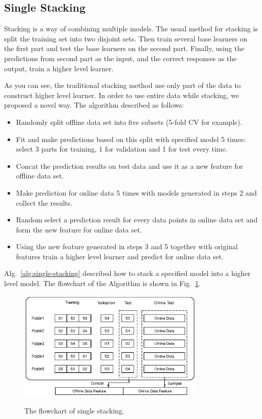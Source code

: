 \documentclass[12pt]{article}
\begin{document}
\subsection{Single Stacking}
\label{chap:single-stacking}

Stacking is a way of combining multiple models. The usual method for stacking is split the training set into two disjoint sets. Then train several base learners on the first part and test the base learners on the second part. Finally, using the predictions from second part as the input, and the correct responses as the output, train a higher level learner.

As you can see, the traditional stacking method use only part of the data to construct higher level learner. In order to use entire data while stacking, we proposed a novel way. The algorithm described as follows:

\begin{itemize}
\label{alg:single-stacking}
\item[1.] Randomly split offline data set into five subsets (5-fold CV for example).
\item[2.] Fit and make predictions based on this split with specified model 5 times: select 3 parts for training, 1 for validation and 1 for test every time.
\item[3.] Concat the prediction results on test data and use it as a new feature for offline data set.
\item[4.] Make prediction for online data 5 times with models generated in steps 2 and collect the results.
\item[5.] Random select a prediction result for every data points in online data set and form the new feature for online data set.
\item[6.] Using the new feature generated in steps 3 and 5 together with original features train a higher level learner and predict for online data set.
\end{itemize}

Alg.~{\ref{alg:single-stacking}} described how to stack a specified model into a higher level model. The flowchart of the Algorithm is shown in Fig.~{\ref{fig:single-stacking}}.


\begin{figure}[ht]
  \centering
  \includegraphics[width=0.8\textwidth]{../img/single-stacking}\\
  \caption{The flowchart of single stacking.}
  \label{fig:single-stacking}
\end{figure}
\end{document}
